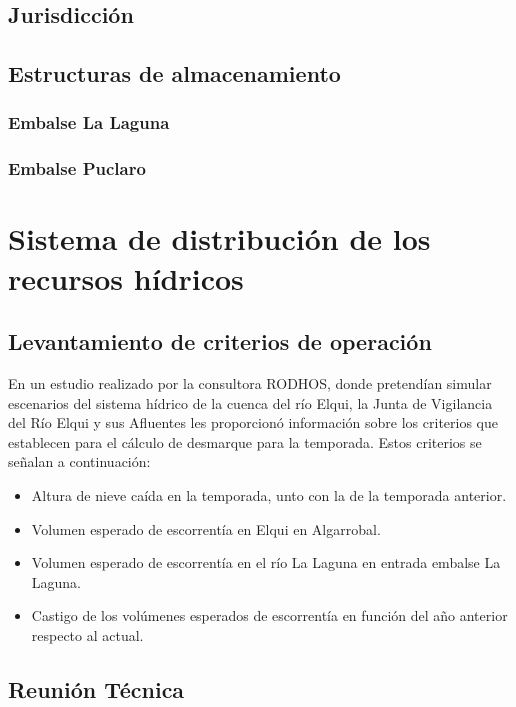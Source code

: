 \documentclass[10pt,]{article}
\begin{document}
		\subsection{Jurisdicción}
		
		\subsection{Estructuras de almacenamiento}\bigskip

			\subsubsection{Embalse La Laguna}

			\subsubsection{Embalse Puclaro}\bigskip

\section{Sistema de distribución de los recursos hídricos}\bigskip

		\subsection{Levantamiento de criterios de operación}
		En un estudio realizado por la consultora RODHOS, donde pretendían simular escenarios del sistema hídrico de la cuenca del río Elqui, la Junta de Vigilancia del Río Elqui y sus Afluentes les proporcionó información sobre los criterios que establecen para el cálculo de desmarque para la temporada. Estos criterios se señalan a continuación:\bigskip
		
		\begin{itemize}
		
		\item Altura de nieve caída en la temporada, unto con la de la temporada anterior.
		\item Volumen esperado de escorrentía en Elqui en Algarrobal.
		\item Volumen esperado de escorrentía en el río La Laguna en entrada embalse La Laguna.
		\item Castigo de los volúmenes esperados de escorrentía en función del año anterior respecto al actual.
		
		\end{itemize}
		
		\subsection{Reunión Técnica}
		
\end{document}
